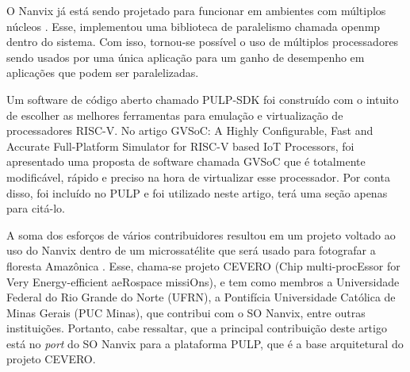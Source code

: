 O Nanvix já está sendo projetado para funcionar em ambientes com múltiplos núcleos \cite{MSC-Reinaldo}. Esse, implementou uma biblioteca de paralelismo chamada 
openmp dentro do sistema. Com isso, tornou-se possível o uso de múltiplos processadores sendo usados por uma única aplicação para um ganho de desempenho em aplicações 
que podem ser paralelizadas.

Um software de código aberto chamado PULP-SDK foi construído com o intuito de escolher as melhores ferramentas para emulação e virtualização de processadores RISC-V. 
No artigo {GVSoC: A Highly Configurable, Fast and Accurate Full-Platform Simulator for RISC-V based IoT Processors}, foi apresentado uma proposta de software chamada
GVSoC que é totalmente modificável, rápido e preciso na hora de virtualizar esse processador. Por conta disso, foi incluído no PULP e foi utilizado neste artigo, terá
uma seção apenas para citá-lo.

A soma dos esforços de vários contribuidores resultou em um projeto voltado ao uso do Nanvix dentro de um microssatélite que será usado 
para fotografar a floresta Amazônica \cite{RepoCervero}. Esse, chama-se projeto CEVERO (Chip multi-procEssor for Very Energy-efficient aeRospace missiOns), e tem 
como membros a Universidade Federal do Rio Grande do Norte (UFRN), a Pontifícia Universidade Católica de Minas Gerais (PUC Minas), que contribui com o SO Nanvix, entre outras instituições. Portanto, cabe ressaltar, que a principal contribuição deste artigo está no \textit{port} do SO Nanvix para a plataforma PULP, que é a base arquitetural do projeto CEVERO.
